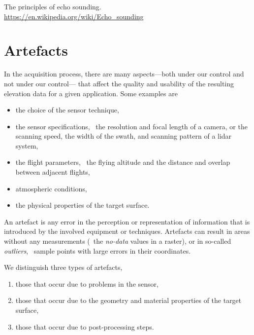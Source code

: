 \begin{kaobox}[frametitle=\faExternalLink\ To read or to watch.]
  The principles of echo sounding.
  \\
  \url{https://en.wikipedia.org/wiki/Echo_sounding}
\end{kaobox}




\section{Artefacts}%
\label{sec:artefacts}

In the acquisition process, there are many aspects---both under our control and not under our control--- that affect the quality and usability of the resulting elevation data for a given application. 
Some examples are
\begin{itemize}
	\item the choice of the sensor technique, 
	\item the sensor specifications, \eg\ the resolution and focal length of a camera, or the scanning speed, the width of the swath, and scanning pattern of a lidar system,
	\item the flight parameters, \eg\ the flying altitude and the distance and overlap between adjacent flights,
	\item atmospheric conditions, 
	\item the physical properties of the target surface.
\end{itemize}

An artefact is any error in the perception or representation of information that is introduced by the involved equipment or techniques. 
Artefacts can result in areas without any measurements (\eg\ the \emph{no-data} values in a raster), or in so-called \emph{outliers}, \ie\ sample points with large errors in their coordinates. 

We distinguish three types of artefacts, 
\begin{enumerate}
	\item those that occur due to problems in the sensor, 
	\item those that occur due to the geometry and material properties of the target surface, 
	\item those that occur due to post-processing steps.
\end{enumerate}


